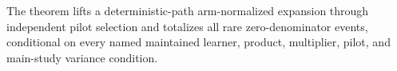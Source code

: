 The theorem lifts a deterministic-path arm-normalized expansion through independent pilot selection and totalizes all rare zero-denominator events, conditional on every named maintained learner, product, multiplier, pilot, and main-study variance condition.